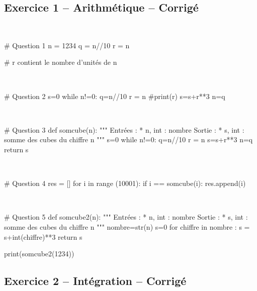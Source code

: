 \documentclass[10pt,fleqn]{article} %
\begin{document}
\begin{multicols}{2}
\subsection*{Exercice 1 -- Arithmétique -- Corrigé}

\begin{corrige}
$\quad$
\begin{python}
# Question 1
n = 1234
q = n//10
r =  n%

# r contient le nombre d'unités de n
\end{python}
\end{corrige}

\begin{corrige}
$\quad$
\begin{python}
# Question 2
s=0
while n!=0:
    q=n//10
    r = n%
    #print(r)
    s=s+r**3
    n=q
\end{python}
\end{corrige}

\begin{corrige}
$\quad$
\begin{python}
# Question 3
def somcube(n):
    """
    Entrées :
     * n, int : nombre
    Sortie : 
     * s, int : somme des cubes du chiffre n
    """
    s=0
    while n!=0:
        q=n//10
        r = n%
        s=s+r**3
        n=q
    return s
\end{python}
\end{corrige}

\begin{corrige}
$\quad$
\begin{python}
# Question 4
res = []
for i in range (10001):
    if i == somcube(i):
        res.append(i)
\end{python}
\end{corrige}

\begin{corrige}
$\quad$
\begin{python}
# Question 5
def somcube2(n):
    """
    Entrées :
     * n, int : nombre
    Sortie : 
     * s, int : somme des cubes du chiffre n
    """
    nombre=str(n)
    s=0
    for chiffre in nombre :
        s = s+int(chiffre)**3
    return s
    
print(somcube2(1234))
\end{python}
\end{corrige}

\subsection*{Exercice 2 -- Intégration -- Corrigé}


\end{multicols}
\end{document}
